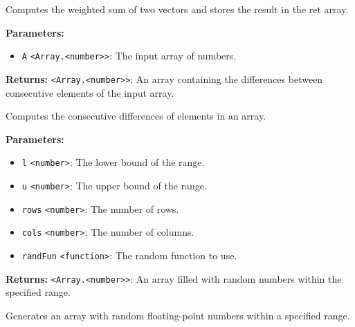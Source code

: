 \documentclass[12pt,a4paper]{article}
\begin{document}
\noindent Computes the weighted sum of two vectors and stores the result in the \textasciigrave{}ret\textasciigrave{} array.

\vspace{5mm}
\noindent {}


\noindent \textbf{Parameters:}
\begin{itemize}
  \item \texttt{A} \texttt{<Array.<number>>}: The input array of numbers.
\end{itemize}

\noindent \textbf{Returns:} \texttt{<Array.<number>>}: An array containing the differences between consecutive elements of the input array.

\noindent Computes the consecutive differences of elements in an array.

\vspace{5mm}
\noindent {}


\noindent \textbf{Parameters:}
\begin{itemize}
  \item \texttt{l} \texttt{<number>}: The lower bound of the range.
  \item \texttt{u} \texttt{<number>}: The upper bound of the range.
  \item \texttt{rows} \texttt{<number>}: The number of rows.
  \item \texttt{cols} \texttt{<number>}: The number of columns.
  \item \texttt{randFun} \texttt{<function>}: The random function to use.
\end{itemize}

\noindent \textbf{Returns:} \texttt{<Array.<number>>}: An array filled with random numbers within the specified range.

\noindent Generates an array with random floating-point numbers within a specified range.

\vspace{5mm}
\noindent {}
\end{document}
